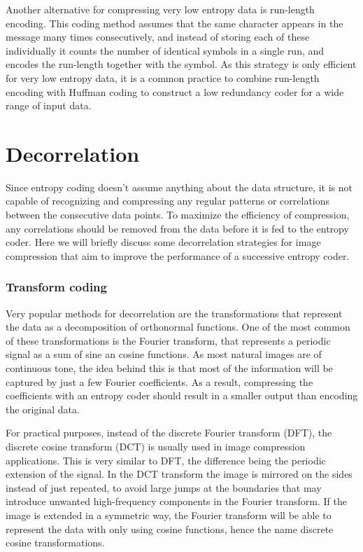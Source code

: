       Another alternative for compressing very low entropy data is run-length encoding. This coding method assumes that the same character appears in the message many times consecutively, and instead of storing each of these individually it counts the number of identical symbols in a single run, and encodes the run-length together with the symbol. As this strategy is only efficient for very low entropy data, it is a common practice to combine run-length encoding with Huffman coding to construct a low redundancy coder for a wide range of input data.
  
    \section{Decorrelation}
      \label{sec:decorrelation}
      Since entropy coding doesn't assume anything about the data structure, it is not capable of recognizing and compressing any regular patterns or correlations between the consecutive data points. To maximize the efficiency of compression, any correlations should be removed from the data before it is fed to the entropy coder. Here we will briefly discuss some decorrelation strategies for image compression that aim to improve the performance of a successive entropy coder.

      \subsubsection{Transform coding}
      Very popular methods for decorrelation are the transformations that represent the data as a decomposition of orthonormal functions. One of the most common of these transformations is the Fourier transform, that represents a periodic signal as a sum of sine an cosine functions. As most natural images are of continuous tone, the idea behind this is that most of the information will be captured by just a few Fourier coefficients. As a result, compressing the coefficients with an entropy coder should result in a smaller output than encoding the original data.

      For practical purposes, instead of the discrete Fourier transform (DFT), the discrete cosine transform (DCT) \cite{ahmed_discrete_1974} is usually used in image compression applications. This is very similar to DFT, the difference being the periodic extension of the signal. In the DCT transform the image is mirrored on the sides instead of just repeated, to avoid large jumps at the boundaries that may introduce unwanted high-frequency components in the Fourier transform. If the image is extended in a symmetric way, the Fourier transform will be able to represent the data with only using cosine functions, hence the name discrete cosine transformations.

